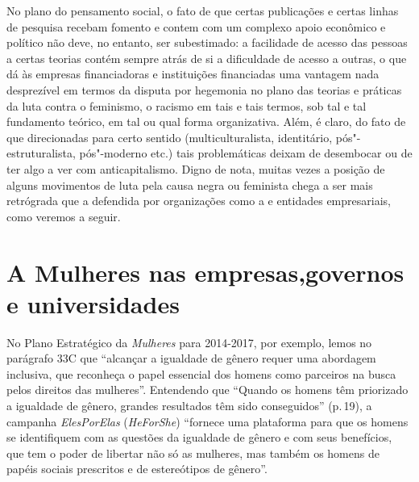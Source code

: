 No plano do pensamento social, o fato de que certas publicações e certas
linhas de pesquisa recebam fomento e contem com um complexo apoio
econômico e político não deve, no entanto, ser subestimado: a facilidade
de acesso das pessoas a certas teorias contém sempre atrás de si a
dificuldade de acesso a outras, o que dá às empresas financiadoras e
instituições financiadas uma vantagem nada desprezível em termos da
disputa por hegemonia no plano das teorias e práticas da luta contra o
feminismo, o racismo em tais e tais termos, sob tal e tal fundamento
teórico, em tal ou qual forma organizativa. Além, é claro, do fato de
que direcionadas para certo sentido (multiculturalista, identitário,
pós"-estruturalista, pós"-moderno etc.) tais problemáticas deixam de
desembocar ou de ter algo a ver com anticapitalismo. Digno de nota,
muitas vezes a posição de alguns movimentos de luta pela causa negra ou
feminista chega a ser mais retrógrada que a defendida por organizações 
como a  e entidades empresariais, como veremos a seguir. 

\chapter[A \versal{ONU} Mulheres nas empresas, governos e universidades]{A  Mulheres nas empresas,\break governos e universidades}

No Plano Estratégico da \emph{ Mulheres} para 2014-2017, por exemplo,
lemos no parágrafo 33C que ``alcançar a igualdade de gênero requer uma
abordagem inclusiva, que reconheça o papel essencial dos homens como
parceiros na busca pelos direitos das mulheres''. Entendendo que
``Quando os homens têm priorizado a igualdade de gênero, grandes
resultados têm sido conseguidos'' (p.\,19), a campanha \emph{ElesPorElas}
(\emph{HeForShe}) ``fornece uma plataforma para que os homens se
identifiquem com as questões da igualdade de gênero e com seus
benefícios, que tem o poder de libertar não só as mulheres, mas também
os homens de papéis sociais prescritos e de estereótipos de gênero''.

